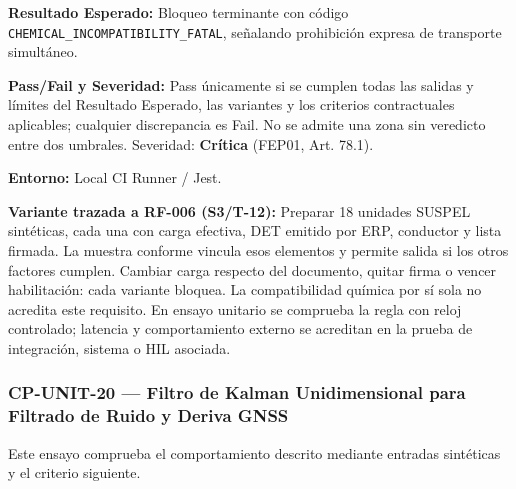 \par\noindent\textbf{Resultado Esperado:} Bloqueo terminante con código \texttt{C\allowbreak{}H\allowbreak{}E\allowbreak{}M\allowbreak{}I\allowbreak{}C\allowbreak{}A\allowbreak{}L\allowbreak{}\_\allowbreak{}I\allowbreak{}N\allowbreak{}C\allowbreak{}O\allowbreak{}M\allowbreak{}P\allowbreak{}A\allowbreak{}T\allowbreak{}I\allowbreak{}B\allowbreak{}I\allowbreak{}L\allowbreak{}I\allowbreak{}T\allowbreak{}Y\allowbreak{}\_\allowbreak{}F\allowbreak{}A\allowbreak{}T\allowbreak{}A\allowbreak{}L\allowbreak{}}, señalando prohibición expresa de transporte simultáneo.\par
\par\noindent\textbf{Pass/Fail y Severidad:} Pass únicamente si se cumplen todas las salidas y límites del Resultado Esperado, las variantes y los criterios contractuales aplicables; cualquier discrepancia es Fail. No se admite una zona sin veredicto entre dos umbrales. Severidad: \textbf{Crítica} (FEP01, Art. 78.1).\par
\par\noindent\textbf{Entorno:} Local CI Runner / Jest.\par







\par\noindent\textbf{Variante trazada a RF-006 (S3/T-12):} Preparar 18 unidades SUSPEL sintéticas, cada una con carga efectiva, DET emitido por ERP, conductor y lista firmada. La muestra conforme vincula esos elementos y permite salida si los otros factores cumplen. Cambiar carga respecto del documento, quitar firma o vencer habilitación: cada variante bloquea. La compatibilidad química por sí sola no acredita este requisito. En ensayo unitario se comprueba la regla con reloj controlado; latencia y comportamiento externo se acreditan en la prueba de integración, sistema o HIL asociada.\par
\subsubsection*{CP-UNIT-20 — Filtro de Kalman Unidimensional para Filtrado de Ruido y Deriva GNSS}\label{sec:9-cp-unit-20}
Este ensayo comprueba el comportamiento descrito mediante entradas sintéticas y el criterio siguiente.

